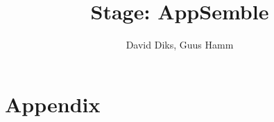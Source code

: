 \documentclass[10pt,a4paper]{report}
\author{David Diks, Guus Hamm}
\title{Stage: AppSemble}
\begin{document}
	\maketitle
	
	\tableofcontents
	\newpage

	
	
	\newpage
	\chapter{Appendix}
	\newpage
	
\end{document}
